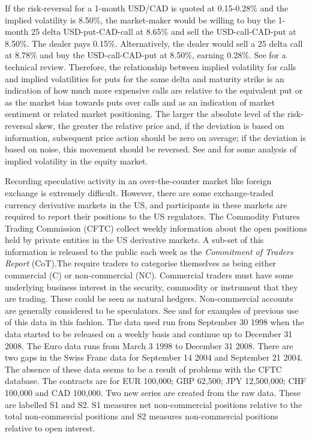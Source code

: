 \documentclass[ijfs,article,submit,oneauthor,pdftex,10pt,a4paper]{mdpi}
\begin{document}
If the risk-reversal for a 1-month USD/CAD is quoted at 0.15-0.28\% and the implied volatility is 8.50\%, the market-maker would be willing to buy the 1-month 25 delta USD-put-CAD-call at 8.65\% and sell the USD-call-CAD-put at 8.50\%.  The dealer pays 0.15\%.  Alternatively, the dealer would sell a 25 delta call at 8.78\% and buy the USD-call-CAD-put at 8.50\%, earning 0.28\%. See \citet{Global} for a technical review.  Therefore, the relationship between implied volatility for calls and implied volatilities for puts for the same delta and maturity strike is an indication of how much more expensive calls are relative to the equivalent put or as the market bias towards puts over calls and as an indication of market sentiment or related market positioning.  The larger the absolute level of the risk-reversal skew, the greater the relative price and, if the deviation is based on information, subsequent price action should be zero on average; if the deviation is based on noise, this movement should be reversed.  See \citet{Yan2011} and \citet{FengZhangFriesen} for some analysis of implied volatility in the equity market. 

Recording speculative activity in an over-the-counter market like foreign exchange is extremely difficult.  However, there are some exchange-traded currency derivative markets in the US, and participants in these markets are required to report their positions to the US regulators.  The Commodity Futures Trading Commission (CFTC) collect weekly information about the open positions held by private entities in the US derivative markets.   A sub-set of this information is released to the public each week as the \emph{Commitment of Traders Report} (CoT).The \citet{cot} require traders to categorise themselves as being either commercial (C) or non-commercial (NC).  Commercial traders must have some underlying business interest in the security, commodity or instrument that they are trading.  These could be seen as natural hedgers.  Non-commercial accounts are generally considered to be speculators.  See \citet{FuturesSanders} and \citet{FuturesWang} for examples of previous use of this data in this fashion.    The data used run from September 30 1998 when the data started to be released on a weekly basis and continue up to December 31 2008.  The Euro data runs from March 3 1998 to December 31 2008.  There are two gaps in the Swiss Franc data for September 14 2004 and September 21 2004.  The absence of these data seems to be a result of problems with the CFTC database.  The contracts are for EUR 100,000; GBP 62,500; JPY 12,500,000; CHF 100,000 and CAD 100,000.  Two new series are created from the raw data.  These are labelled S1 and S2.  S1 measures net non-commercial positions relative to the total non-commercial positions and S2 measures non-commercial positions relative to open interest. 
\end{document}
